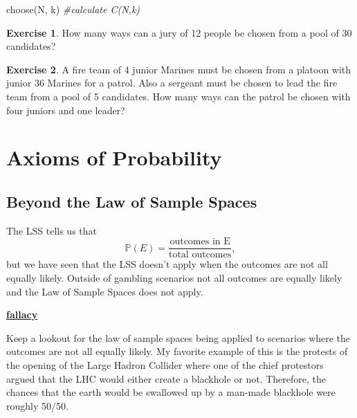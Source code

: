 \documentclass[
]{book}
\newenvironment{Shaded}{\begin{snugshade}}{\end{snugshade}}
\newcommand{\CommentTok}[1]{\textcolor[rgb]{0.56,0.35,0.01}{\textit{#1}}}
\newcommand{\FunctionTok}[1]{\textcolor[rgb]{0.00,0.00,0.00}{#1}}
\newcommand{\NormalTok}[1]{#1}
\newcommand{\prob}[1]{{\mathbb{P}(#1)}}
\newenvironment{rmdblock}[1]
  {\begin{shaded*}
  \centerline{\underline{\textbf{#1}}}

  }
  {
  \end{shaded*}
  }
\newenvironment{fallacy}
  {\begin{rmdblock}{fallacy}}
  {\end{rmdblock}}
\theoremstyle{definition}
\theoremstyle{definition}
\theoremstyle{definition}
\newtheorem{exercise}{Exercise}[chapter]
\theoremstyle{definition}
\theoremstyle{remark}
\begin{document}
\begin{Shaded}
\begin{Highlighting}[]
\FunctionTok{choose}\NormalTok{(N, k)  }\CommentTok{\#calculate C(N,k) }
\end{Highlighting}
\end{Shaded}

\begin{exercise}
\protect\hypertarget{exr:unnamed-chunk-222}{}\label{exr:unnamed-chunk-222}How many ways can a jury of 12 people be chosen from a pool of 30 candidates?
\end{exercise}

\begin{exercise}
\protect\hypertarget{exr:unnamed-chunk-223}{}\label{exr:unnamed-chunk-223}A fire team of 4 junior Marines must be chosen from a platoon with junior 36 Marines for a patrol. Also a sergeant must be chosen to lead the fire team from a pool of 5 candidates. How many ways can the patrol be chosen with four juniors and one leader?
\end{exercise}

\hypertarget{axioms-of-probability}{%
\section{Axioms of Probability}\label{axioms-of-probability}}

\hypertarget{beyond-the-law-of-sample-spaces}{%
\subsection{Beyond the Law of Sample Spaces}\label{beyond-the-law-of-sample-spaces}}

The LSS tells us that \[\prob{E}=\frac{\text{outcomes in E}}{\text{total outcomes}},\] but we have seen that the LSS doesn't apply when the outcomes are not all equally likely. Outside of gambling scenarios not all outcomes are equally likely and the Law of Sample Spaces does not apply.

\begin{fallacy}
Keep a lookout for the law of sample spaces being applied to scenarios where the outcomes are not all equally likely. My favorite example of this is the protests of the opening of the Large Hadron Collider where one of the chief protestors argued that the LHC would either create a blackhole or not. Therefore, the chances that the earth would be swallowed up by a man-made blackhole were roughly 50/50.
\end{fallacy}
\end{document}
